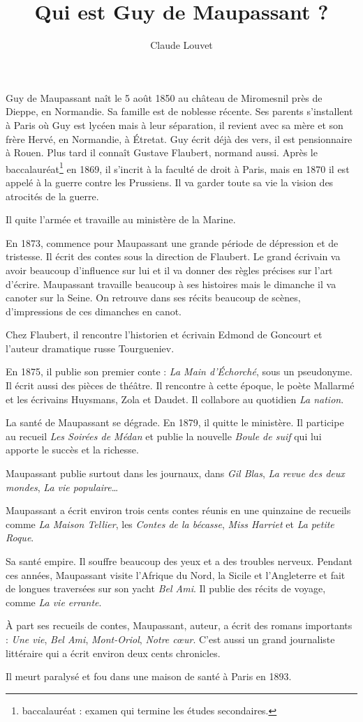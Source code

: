 \documentclass[a5paper,notitlepage]{article}
\author{Claude Louvet}
\title{Qui est Guy de Maupassant ?}
\begin{document}
\maketitle

Guy de Maupassant naît le 5 août 1850 au château de Miromesnil près de Dieppe, en Normandie. Sa famille est de
noblesse récente. Ses parents s'installent à Paris où Guy est lycéen mais à leur séparation, il revient avec sa mère
et son frère Hervé, en Normandie, à Étretat. Guy écrit déjà des vers, il est pensionnaire à Rouen. Plus tard il connaît
Gustave Flaubert, normand aussi. Après le baccalauréat\footnote{baccalauréat : examen qui termine les études
secondaires.} en 1869, il s'incrit à la faculté de droit à Paris, mais en 1870 il est appelé à la guerre contre les
Prussiens. Il va garder toute sa vie la vision des atrocités de la guerre.

Il quite l'armée et travaille au ministère de la Marine.

En 1873, commence pour Maupassant une grande période de dépression et de tristesse. Il écrit des contes sous la direction de
Flaubert. Le grand écrivain va avoir beaucoup d'influence sur lui et il va donner des règles précises sur l'art d'écrire.
Maupassant travaille beaucoup à ses histoires mais le dimanche il va canoter sur la Seine. On retrouve dans ses récits beaucoup
de scènes, d'impressions de ces dimanches en canot.

Chez Flaubert, il rencontre l'historien et écrivain Edmond de Goncourt et l'auteur dramatique russe Tourgueniev.

En 1875, il publie son premier conte : \emph{La Main d'Échorché}, sous un pseudonyme. Il écrit aussi des pièces de théâtre. Il
rencontre à cette époque, le poète Mallarmé et les écrivains Huysmans, Zola et Daudet. Il collabore au quotidien \emph{La nation}.

La santé de Maupassant se dégrade. En 1879, il quitte le ministère. Il participe au recueil \emph{Les Soirées de Médan} et publie
la nouvelle \emph{Boule de suif} qui lui apporte le succès et la richesse.

Maupassant publie surtout dans les journaux, dans \emph{Gil Blas}, \emph{La revue des deux mondes}, \emph{La vie populaire}\ldots{}

Maupassant a écrit environ trois cents contes réunis en une quinzaine de recueils comme \emph{La Maison Tellier}, les \emph{Contes
de la bécasse}, \emph{Miss Harriet} et \emph{La petite Roque}.

Sa santé empire. Il souffre beaucoup des yeux et a des troubles nerveux. Pendant ces années, Maupassant visite l'Afrique du Nord,
la Sicile et l'Angleterre et fait de longues traversées sur son yacht \emph{Bel Ami}. Il publie des récits de voyage, comme
\emph{La vie errante}.

À part ses recueils de contes, Maupassant, auteur, a écrit des romans importants : \emph{Une vie}, \emph{Bel Ami},
\emph{Mont-Oriol}, \emph{Notre cœur}. C'est aussi un grand journaliste littéraire qui a écrit environ deux cents chronicles.

Il meurt paralysé et fou dans une maison de santé à Paris en 1893.
\end{document}
